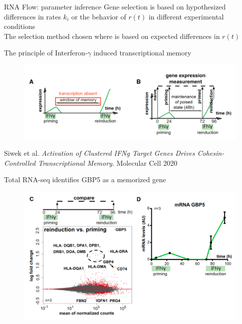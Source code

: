 \documentclass[aspectratio=1610]{beamer}					%
\begin{document}
\begin{frame}{RNA Flow: parameter inference}
Gene selection is based on hypothesized differences in rates $k_{i}$ or the behavior of $r(t)$ in different experimental conditions\\
\vspace{0.2in}
The selection method chosen where is based on expected differences in $r(t)$
\end{frame}



\begin{frame}{The principle of Interferon-$\gamma$ induced transcriptional memory}
\begin{figure}
\includegraphics[width=14cm]{figure-1.png}
\caption{}
\end{figure}

Siwek et al. \textit{Activation of Clustered IFNg Target Genes Drives Cohesin-Controlled Transcriptional Memory}. Molecular Cell 2020

\end{frame}


\begin{frame}{Total RNA-seq identifies GBP5 as a memorized gene}
\begin{figure}
\includegraphics[width=13cm]{figure-2.png}
\end{figure}

\end{frame}
\end{document}
